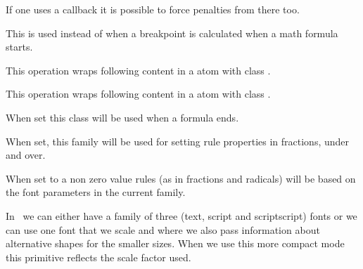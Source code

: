 \popoverloadmode

If one uses a callback it is possible to force penalties from there too.

\stopnewprimitive

\startnewprimitive[title={\prm {mathpretolerance}}]

This is used instead of  when a breakpoint is calculated when
a math formula starts.

\stopnewprimitive

\startoldprimitive[title={\prm {mathpunct}}]

This operation wraps following content in a atom with class .

\stopoldprimitive

\startoldprimitive[title={\prm {mathrel}}]

This operation wraps following content in a atom with class .

\stopoldprimitive

\startnewprimitive[title={\prm {mathrightclass}}]

When set this class will be used when a formula ends.

\stopnewprimitive

\startnewprimitive[title={\prm {mathrulesfam}}]

When set, this family will be used for setting rule properties in fractions,
under and over.

\stopnewprimitive

\startnewprimitive[title={\prm {mathrulesmode}}]

When set to a non zero value rules (as in fractions and radicals) will be based
on the font parameters in the current family.

\stopnewprimitive

\startnewprimitive[title={\prm {mathscale}}]

In \LUAMETATEX\ we can either have a family of three (text, script and
scriptscript) fonts or we can use one font that we scale and where we also pass
information about alternative shapes for the smaller sizes. When we use this
more compact mode this primitive reflects the scale factor used.

\startbuffer
\im {
    \textstyle        \the\mathscale\textfont        \fam\enspace
    \scriptstyle      \the\mathscale\scriptfont      \fam\enspace
    \scriptscriptstyle\the\mathscale\scriptscriptfont\fam\enspace
    \textstyle        \the\mathscale\textfont        \fam\enspace
    \scriptstyle      \the\mathscale\textfont        \fam\enspace
    \scriptscriptstyle\the\mathscale\textfont        \fam

}
\stopbuffer

